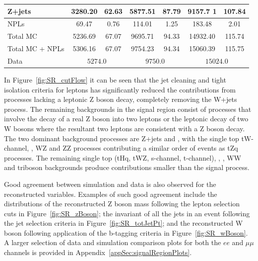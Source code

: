 \begin{table}[hp]
\begin{tabular}{l S[table-format=5.3] @{${}\pm{}$} S[table-format=2.3] S[table-format=5.3] @{${}\pm{}$} S[table-format=2.3] S[table-format=5.3] @{${}\pm{}$} S[table-format=3.2]}
Z+jets & 3280.20 & 62.63 & 5877.51 & 87.79 & 9157.7 1 & 107.84    \\
\hline
NPLs & 69.47 & 0.76 & 114.01 & 1.25 & 183.48 & 2.01   \\
\hline
Total MC & 5236.69 & 67.07 & 9695.71 & 94.33 & 14932.40 & 115.74    \\
Total MC + NPLs & 5306.16 & 67.07 & 9754.23 & 94.34 & 15060.39 & 115.75    \\
\hline
Data &  &  &     \\
\hline
\end{tabular}
\end{table}

In Figure~\ref{fig:SR_cutFlow} it can be seen that the jet cleaning and tight isolation criteria for leptons has significantly reduced the contributions from processes lacking a leptonic Z boson decay, completely removing the W+jets process.
The remaining backgrounds in the signal region consist of processes that involve the decay of a  real Z boson into two leptons or the leptonic decay of two W bosons where the resultant two leptons are consistent with a Z boson decay.
The two dominant background processes are Z+jets and \ttbar, with the single top tW-channel, \ttbarZ, WZ and ZZ processes contributing a similar order of events as tZq processes.
The remaining single top (tHq, tWZ, s-channel, t-channel), \ttbarW, \ttbarH, WW and triboson backgrounds produce contributions smaller than the signal process.

Good agreement between simulation and data is also observed for the reconstructed variables.
Examples of such good agreement include the distributions of the reconstructed Z boson mass following the lepton selection cuts in Figure~\ref{fig:SR_zBoson}; the invariant \pT of all the jets in an event following the jet selection criteria in Figure~\ref{fig:SR_totJetPt}; and the reconstructed W boson following application of the b-tagging criteria in Figure~\ref{fig:SR_wBoson}.
A larger selection of data and simulation comparison plots for both the $ee$ and $\mu\mu$ channels is provided in Appendix~\ref{appSec:signalRegionPlots}.

